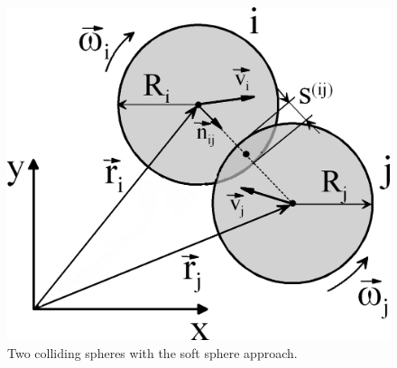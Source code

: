 \begin{figure}[!h]
\centering
\includegraphics[width=.6\columnwidth]{images/109twospheres}
\caption[Two spheres]{Two colliding spheres with the soft sphere approach.}
\label{fig:109twospheres}
\end{figure}